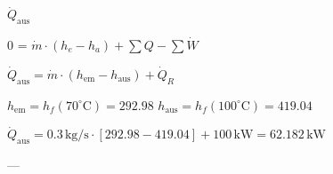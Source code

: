 \( \dot{Q}_{\text{aus}} \)  

0 = \( \dot{m} \cdot (h_e - h_a) + \sum Q - \sum \dot{W} \)  

\( \dot{Q}_{\text{aus}} = \dot{m} \cdot (h_{\text{em}} - h_{\text{aus}}) + \dot{Q}_R \)  

\( h_{\text{em}} = h_f(70^\circ \text{C}) = 292.98 \)  
\( h_{\text{aus}} = h_f(100^\circ \text{C}) = 419.04 \)  

\( \dot{Q}_{\text{aus}} = 0.3 \, \text{kg/s} \cdot [292.98 - 419.04] + 100 \, \text{kW} = 62.182 \, \text{kW} \)  

---